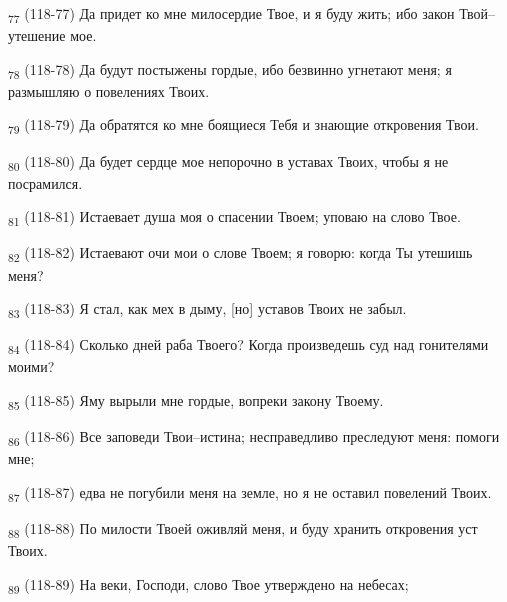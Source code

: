 \begin{tcolorbox}
\textsubscript{77} (118-77) Да придет ко мне милосердие Твое, и я буду жить; ибо закон Твой--утешение мое.
\end{tcolorbox}
\begin{tcolorbox}
\textsubscript{78} (118-78) Да будут постыжены гордые, ибо безвинно угнетают меня; я размышляю о повелениях Твоих.
\end{tcolorbox}
\begin{tcolorbox}
\textsubscript{79} (118-79) Да обратятся ко мне боящиеся Тебя и знающие откровения Твои.
\end{tcolorbox}
\begin{tcolorbox}
\textsubscript{80} (118-80) Да будет сердце мое непорочно в уставах Твоих, чтобы я не посрамился.
\end{tcolorbox}
\begin{tcolorbox}
\textsubscript{81} (118-81) Истаевает душа моя о спасении Твоем; уповаю на слово Твое.
\end{tcolorbox}
\begin{tcolorbox}
\textsubscript{82} (118-82) Истаевают очи мои о слове Твоем; я говорю: когда Ты утешишь меня?
\end{tcolorbox}
\begin{tcolorbox}
\textsubscript{83} (118-83) Я стал, как мех в дыму, [но] уставов Твоих не забыл.
\end{tcolorbox}
\begin{tcolorbox}
\textsubscript{84} (118-84) Сколько дней раба Твоего? Когда произведешь суд над гонителями моими?
\end{tcolorbox}
\begin{tcolorbox}
\textsubscript{85} (118-85) Яму вырыли мне гордые, вопреки закону Твоему.
\end{tcolorbox}
\begin{tcolorbox}
\textsubscript{86} (118-86) Все заповеди Твои--истина; несправедливо преследуют меня: помоги мне;
\end{tcolorbox}
\begin{tcolorbox}
\textsubscript{87} (118-87) едва не погубили меня на земле, но я не оставил повелений Твоих.
\end{tcolorbox}
\begin{tcolorbox}
\textsubscript{88} (118-88) По милости Твоей оживляй меня, и буду хранить откровения уст Твоих.
\end{tcolorbox}
\begin{tcolorbox}
\textsubscript{89} (118-89) На веки, Господи, слово Твое утверждено на небесах;
\end{tcolorbox}
